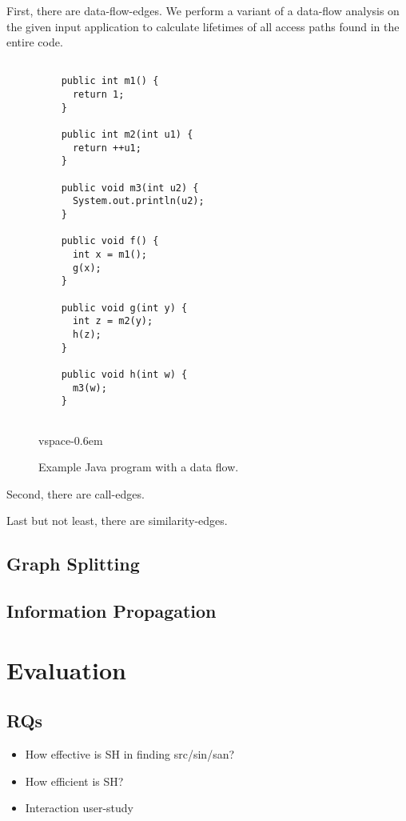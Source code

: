 \documentclass[sigconf,review,anonymous]{acmart}\settopmatter{printfolios=true,printccs=false,printacmref=false}
\begin{document}
First, there are data-flow-edges. We perform a variant of a data-flow analysis on the
given input application to calculate lifetimes of all access paths found in the entire code.

\begin{figure}[t]
  \begin{lstlisting}

    public int m1() {
      return 1;
    }

    public int m2(int u1) {
      return ++u1;
    }

    public void m3(int u2) {
      System.out.println(u2);
    }

    public void f() {
      int x = m1();
      g(x);
    }

    public void g(int y) {
      int z = m2(y);
      h(z);
    }

    public void h(int w) {
      m3(w);
    }
    
  \end{lstlisting}
\caption{Example Java program with a data flow.}
vspace{-0.6em}
\label{fig:sca}
\end{figure}




Second, there are call-edges.

Last but not least, there are similarity-edges.


\subsection{Graph Splitting}



\subsection{Information Propagation}


\section{Evaluation}

\subsection{RQs}
\begin{itemize}
  \item How effective is SH in finding src/sin/san?  %
  \item How efficient is SH?
  \item Interaction user-study %
\end{itemize}
\end{document}
